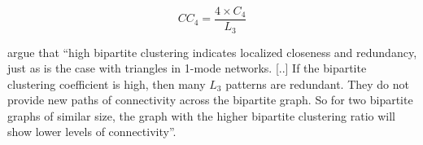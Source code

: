 \begin{equation}
\label{e:robins}
CC_4 = \frac{4 \times C_4}{L_3}
\end{equation}

\citet[79]{robins:2004} argue that ``high bipartite clustering indicates localized closeness and redundancy, just as is the case with triangles in 1-mode networks. [..] If the bipartite clustering coefficient is high, then many $L_3$ patterns are redundant. They do not provide new paths of connectivity across the bipartite graph. So for two bipartite graphs of similar size, the graph with the higher bipartite clustering ratio will show lower levels of connectivity''.
